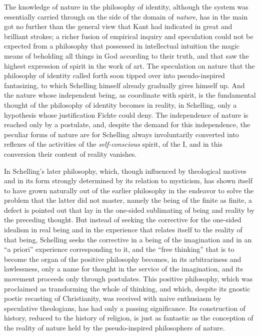 The knowledge of nature in the philosophy of identity, although the
system was essentially carried through on the side of the domain of
\emph{nature}, has in the main got no further than the general view
that Kant had indicated in great and brilliant strokes; a richer fusion
of empirical inquiry and speculation could not be expected from a
philosophy that possessed in intellectual intuition the magic means of
beholding all things in God according to their truth, and that saw the
highest expression of spirit in the work of art. The speculation on
nature that the philosophy of identity called forth soon tipped over
into pseudo-inspired fantasizing, to which Schelling himself already
gradually gives himself up. And the nature whose independent being, as
coordinate with spirit, is the fundamental thought of the philosophy of
identity becomes in reality, in Schelling, only a hypothesis
whose justification Fichte could deny. The independence of nature is
reached only by a postulate, and, despite the demand for this
independence, the peculiar forms of nature are for Schelling always
involuntarily converted into reflexes of the activities of the
\emph{self-conscious} spirit, of the I, and in this conversion their
content of reality vanishes.

In Schelling's later philosophy, which, though influenced by
theological motives and in its form strongly determined by its relation
to mysticism, has shown itself to have grown naturally out of the
earlier philosophy in the endeavor to solve the problem that the latter
did not master, namely the being of the finite as finite, a defect is
pointed out that lay in the one-sided sublimating of being and reality
by the preceding thought. But instead of seeking the corrective for the
one-sided idealism in real being and in the experience that relates
itself to the reality of that being, Schelling seeks the corrective in a
being of the imagination and in an ``a priori'' experience corresponding
to it, and the ``free thinking'' that is to become the organ of the
positive philosophy becomes, in its arbitrariness and lawlessness, only
a name for thought in the service of the imagination, and its movement
proceeds only through postulates. This positive philosophy, which was
proclaimed as transforming the whole of thinking, and which, despite
its gnostic poetic recasting of Christianity, was received with naive
enthusiasm by speculative theologians, has had only a passing
significance. Its construction of history, reduced to the history of
religion, is just as fantastic as the conception of the reality of
nature held by the pseudo-inspired philosophers of nature.

